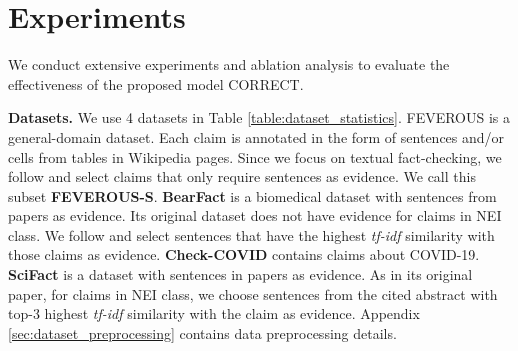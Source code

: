 \section{Experiments}

We conduct extensive experiments and ablation analysis to evaluate the effectiveness of the proposed model CORRECT.

\textbf{Datasets.} We use 4 datasets in Table \ref{table:dataset_statistics}. FEVEROUS \cite{feverous} is a general-domain dataset. Each claim is annotated in the form of sentences and/or cells from tables in Wikipedia pages. Since we focus on textual fact-checking, we follow \cite{programfc} and select claims that only require sentences as evidence. We call this subset \textbf{FEVEROUS-S}. \textbf{BearFact} \cite{bear_fact} is a biomedical dataset with sentences from papers as evidence. Its original dataset does not have evidence for claims in NEI class. We follow \cite{protoco} and select sentences that have the highest \textit{tf-idf} similarity with those claims as evidence. \textbf{Check-COVID} \cite{check_covid} contains claims about COVID-19. \textbf{SciFact} \cite{scifact} is a dataset with sentences in papers as evidence. As in its original paper, for claims in NEI class, we choose sentences from the cited abstract with top-3 highest \textit{tf-idf} similarity with the claim as evidence. Appendix \ref{sec:dataset_preprocessing} contains data preprocessing details.

\begin{table}
	\centering
	\caption{Dataset statistics.}
	\label{table:dataset_statistics}
\end{table}

